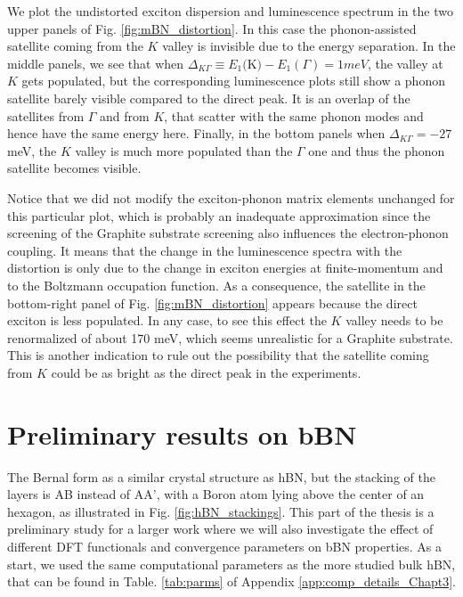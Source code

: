 We plot the undistorted exciton dispersion and luminescence spectrum in the two upper panels of Fig. \ref{fig:mBN_distortion}. In this case the phonon-assisted satellite coming from the $K$ valley is invisible due to the energy separation. In the middle panels, we see that when $\Delta_{K\Gamma} \equiv E_1($K$) - E_1(\Gamma) = 1 meV$, the valley at $K$ gets populated, but the corresponding luminescence plots still show a phonon satellite barely visible compared to the direct peak. It is an overlap of the satellites from $\Gamma$ and from $K$, that scatter with the same phonon modes and hence have the same energy here. Finally, in the bottom panels when $\Delta_{K\Gamma} = -27$ meV, the $K$ valley is much more populated than the $\Gamma$ one and thus the phonon satellite becomes visible. 

Notice that we did not modify the exciton-phonon matrix elements unchanged for this particular plot, which is probably an inadequate approximation since the screening of the Graphite substrate screening also influences the electron-phonon coupling.\cite{sohier2021remote} It means that the change in the luminescence spectra with the distortion is only due to the change in exciton energies at finite-momentum and to the Boltzmann occupation function. As a consequence, the satellite in the bottom-right panel of Fig. \ref{fig:mBN_distortion} appears because the direct exciton is less populated. In any case, to see this effect the $K$ valley needs to be renormalized of about 170 meV, which seems unrealistic for a Graphite substrate. This is another indication to rule out the possibility that the satellite coming from $K$ could be as bright as the direct peak in the experiments.

%
\section{Preliminary results on bBN}
The Bernal form as a similar crystal structure as \acrshort{hBN}, but the stacking of the layers is AB instead of AA', with a Boron atom lying above the center of an hexagon, as illustrated in Fig. \ref{fig:hBN_stackings}.
This part of the thesis is a preliminary study for a larger work where we will also investigate the effect of different \acrshort{DFT} functionals and convergence parameters on \acrshort{bBN} properties. As a start, we used the same computational parameters as the more studied bulk \acrshort{hBN}, that can be found in Table. \ref{tab:parms} of Appendix \ref{app:comp_details_Chapt3}.

